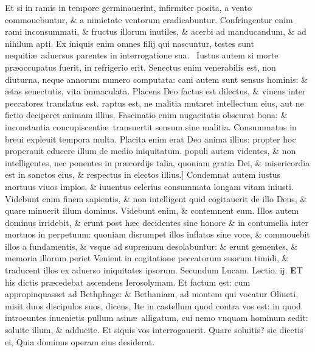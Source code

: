 \documentclass[a5paper,10pt]{book}
\def\leftmarginnote{%
	\lrmarginnote{\hskip -\marginparsep \hskip -6.5em}}
\def\rightmarginnote{%
	\lrmarginnote{\hskip\columnwidth \hskip -1em}}
\def\ae{æ}
\begin{document}
\begin{multicols*}{2}
Et si in ramis in tempore
germinauerint, infirmiter posita, a vento commouebuntur, \& a nimietate ventorum eradicabuntur.
Confringentur enim rami inconsummati, \& fructus illorum inutiles, \& acerbi ad manducandum, \& ad nihilum apti.
Ex iniquis enim omnes filij qui nascuntur, testes sunt nequiti\ae \ aduersus parentes in interrogatione sua. \textdagger \ 
Iustus\leftmarginnote{\begin{flushright}C\end{flushright}} autem si morte pr\ae occupatus fuerit, in refrigerio erit.
Senectus enim venerabilis est, non diuturna, neque annorum numero computata: cani autem sunt sensus hominis: \& \ae tas senectutis, vita immaculata.
Placens Deo factus est dilectus, \& viuens inter peccatores translatus est.
raptus est, ne malitia mutaret intellectum eius, aut ne fictio deciperet animam illius. Fascinatio enim nugacitatis obscurat bona: \& inconstantia concupiscenti\ae \ transuertit sensum sine malitia.
Consummatus in breui expleuit tempora multa. Placita enim erat Deo anima illius: propter hoc properauit educere illum de medio iniquitatum.
populi autem videntes, \& non intelligentes, nec ponentes in pr\ae cordijs talia, quoniam gratia Dei, \& misericordia est in sanctos eius, \& respectus in electos illius.]
Condemnat\rightmarginnote{D} autem iustus mortuus viuos impios, \& iuuentus celerius consummata longam vitam iniusti.
Videbunt enim finem sapientis, \& non intelligent quid cogitauerit de illo Deus, \& quare minuerit illum dominus.
Videbunt enim, \& contemnent eum. Illos autem dominus irridebit, \& erunt post h\ae c decidentes sine honore \& in contumelia inter mortuos in perpetuum: quoniam disrumpet illos inflatos sine voce, \& commouebit illos a fundamentis, \& vsque ad supremum desolabuntur: \& erunt gementes, \& memoria illorum periet
Venient in cogitatione peccatorum suorum timidi, \& traducent illos ex aduerso iniquitates ipsorum.
\newline \color{red} Secundum Lucam. \hfill Lectio. ij. \color{black}
\vspace{-.25em}
\lettrine[lines=2]{\bfseries \color{red} E}{}T\rightmarginnote{c. 19.} his dictis pr\ae cedebat ascendens Ierosolymam.
Et factum est: cum appropinquasset ad Bethphage: \& Bethaniam, ad montem qui vocatur Oliueti, misit duos discipulos suos, dicens, Ite in castellum quod contra vos est: in quod introeuntes inuenietis pullum asin\ae \ alligatum, cui nemo vnquam hominum sedit: soluite illum, \& adducite.
Et siquis vos interrogauerit. Quare soluitis? sic dicetis ei, Quia dominus operam eius desiderat.

\end{multicols*}
\end{document}
